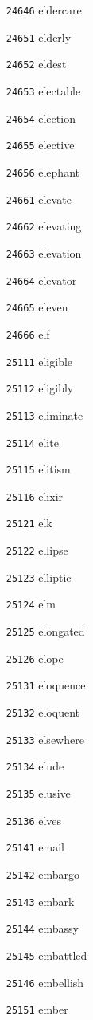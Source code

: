\documentclass[twoside,11pt]{article}
\begin{document}
\begin{multicols}{5}
\begin{enumerate}
\item[\texttt{24646}] eldercare
\item[\texttt{24651}] elderly
\item[\texttt{24652}] eldest
\item[\texttt{24653}] electable
\item[\texttt{24654}] election
\item[\texttt{24655}] elective
\item[\texttt{24656}] elephant
\item[\texttt{24661}] elevate
\item[\texttt{24662}] elevating
\item[\texttt{24663}] elevation
\item[\texttt{24664}] elevator
\item[\texttt{24665}] eleven
\item[\texttt{24666}] elf
\item[\texttt{25111}] eligible
\item[\texttt{25112}] eligibly
\item[\texttt{25113}] eliminate
\item[\texttt{25114}] elite
\item[\texttt{25115}] elitism
\item[\texttt{25116}] elixir
\item[\texttt{25121}] elk
\item[\texttt{25122}] ellipse
\item[\texttt{25123}] elliptic
\item[\texttt{25124}] elm
\item[\texttt{25125}] elongated
\item[\texttt{25126}] elope
\item[\texttt{25131}] eloquence
\item[\texttt{25132}] eloquent
\item[\texttt{25133}] elsewhere
\item[\texttt{25134}] elude
\item[\texttt{25135}] elusive
\item[\texttt{25136}] elves
\item[\texttt{25141}] email
\item[\texttt{25142}] embargo
\item[\texttt{25143}] embark
\item[\texttt{25144}] embassy
\item[\texttt{25145}] embattled
\item[\texttt{25146}] embellish
\item[\texttt{25151}] ember

\end{enumerate}
\end{multicols}
\end{document}
